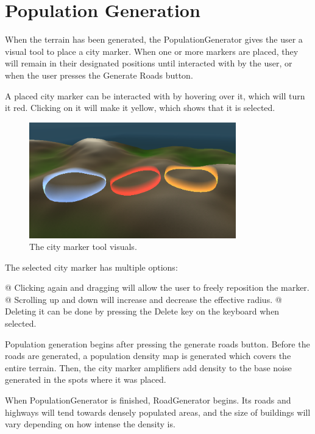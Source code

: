 \section{Population Generation}

When the terrain has been generated, the PopulationGenerator gives the user a visual tool to place a city marker.
When one or more markers are placed, they will remain in their designated positions until interacted with by the user, or when the user presses the Generate Roads button.

A placed city marker can be interacted with by hovering over it, which will turn it red.
Clicking on it will make it yellow, which shows that it is selected. 

\begin{figure}[h!]
  \centering

  \includegraphics[width=0.8\textwidth]{figure/citymarkers.png}
  \caption{The city marker tool visuals. }

  \label{fig:citymarkers}
\end{figure}

The selected city marker has multiple options:
\begin{easylist}
  @ Clicking again and dragging will allow the user to freely reposition the marker.
  @ Scrolling up and down will increase and decrease the effective radius.
  @ Deleting it can be done by pressing the Delete key on the keyboard when selected.
\end{easylist}


Population generation begins after pressing the generate roads button.
Before the roads are generated, a population density map is generated which covers the entire terrain.
Then, the city marker amplifiers add density to the base noise generated in the spots where it was placed.

When PopulationGenerator is finished, RoadGenerator begins.
Its roads and highways will tend towards densely populated areas, and the size of buildings will vary depending on how intense the density is.
